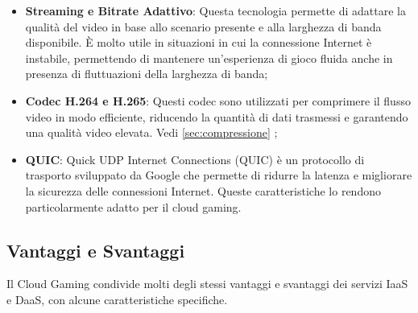 \documentclass[12pt,a4paper,openright,twoside]{book}
\begin{document}
\begin{itemize}
    \item \textbf{Streaming e Bitrate Adattivo}: Questa tecnologia permette di adattare la qualità del video in base allo scenario presente e alla larghezza di banda disponibile. È molto utile in situazioni in cui la connessione Internet è instabile, permettendo di mantenere un'esperienza di gioco fluida anche in presenza di fluttuazioni della larghezza di banda\cite{HARLE2023};
    \item \textbf{Codec H.264 e H.265}: Questi codec sono utilizzati per comprimere il flusso video in modo efficiente, riducendo la quantità di dati trasmessi e garantendo una qualità video elevata. Vedi \ref{sec:compressione} \cite{HARLE2023};
    \item \textbf{QUIC}: Quick UDP Internet Connections (QUIC) è un protocollo di trasporto sviluppato da Google che permette di ridurre la latenza e migliorare la sicurezza delle connessioni Internet. Queste caratteristiche lo rendono particolarmente adatto per il cloud gaming\cite{HARLE2023}.
\end{itemize}

\subsection{Vantaggi e Svantaggi}
Il Cloud Gaming condivide molti degli stessi vantaggi e svantaggi dei servizi IaaS e DaaS, con alcune caratteristiche specifiche.
\end{document}
